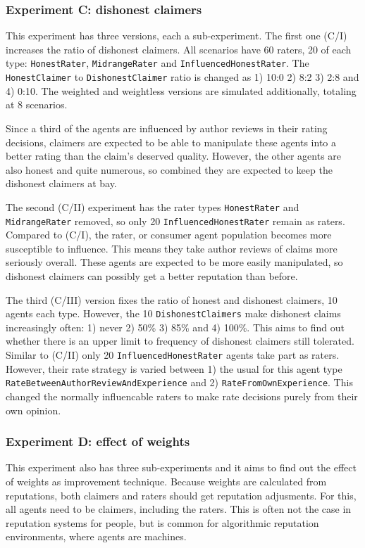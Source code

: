 \documentclass[%
    ]{\PathToTumTemplate/thesis/tum_thesis}
\begin{document}
\subsubsection{Experiment C: dishonest claimers}
This experiment has three versions, each a sub-experiment.
The first one (C/I) increases the ratio of dishonest claimers.
All scenarios have 60 raters, 20 of each type: \texttt{HonestRater}, \texttt{MidrangeRater} and \texttt{InfluencedHonestRater}.
The \texttt{HonestClaimer} to \texttt{DishonestClaimer} ratio is changed as 1) 10:0 2) 8:2 3) 2:8 and 4) 0:10.
The weighted and weightless versions are simulated additionally, totaling at 8 scenarios.

Since a third of the agents are influenced by author reviews in their rating decisions, claimers are expected to be able to manipulate these agents into a better rating than the claim's deserved quality.
However, the other agents are also honest and quite numerous, so combined they are expected to keep the dishonest claimers at bay.

The second (C/II) experiment has the rater types \texttt{HonestRater} and \texttt{MidrangeRater} removed, so only 20 \texttt{InfluencedHonestRater} remain as raters.
Compared to (C/I), the rater, or consumer agent population becomes more susceptible to influence.
This means they take author reviews of claims more seriously overall.
These agents are expected to be more easily manipulated, so dishonest claimers can possibly get a better reputation than before.

The third (C/III) version fixes the ratio of honest and dishonest claimers, 10 agents each type.
However, the 10 \texttt{DishonestClaimers} make dishonest claims increasingly often: 1) never 2) 50\% 3) 85\% and 4) 100\%.
This aims to find out whether there is an upper limit to frequency of dishonest claimers still tolerated.
Similar to (C/II) only 20 \texttt{InfluencedHonestRater} agents take part as raters.
However, their rate strategy is varied between 1) the usual for this agent type \texttt{RateBetweenAuthorReviewAndExperience} and 2) \texttt{RateFromOwnExperience}.
This changed the normally influencable raters to make rate decisions purely from their own opinion.

\subsubsection{Experiment D: effect of weights}
This experiment also has three sub-experiments and it aims to find out the effect of weights as improvement technique.
Because weights are calculated from reputations, both claimers and raters should get reputation adjusments.
For this, all agents need to be claimers, including the raters.
This is often not the case in reputation systems for people, but is common for algorithmic reputation environments, where agents are machines.
\end{document}
